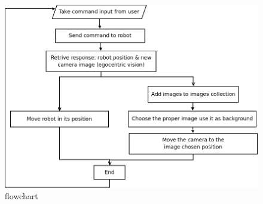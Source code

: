 \begin{figure}[!h]
  \begin{center}
    \includegraphics[width=\textwidth]{img/overall_diagram.png}
    \caption{\framework{} flowchart}
    \label{fig:overall_diagram}
  \end{center}
\end{figure}

\clearpage

\clearpage

\clearpage


